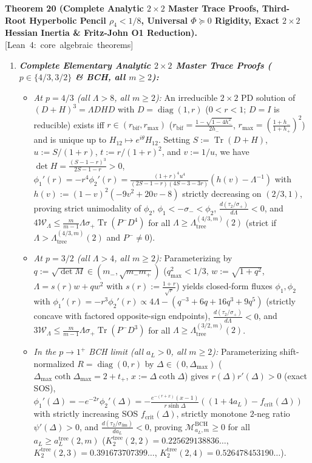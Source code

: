 \documentclass[10pt,letterpaper]{article}
\newcommand{\leanbadge}[1]{\mbox{\sffamily\scriptsize\color{leanborder}[#1]}}
\newcommand{\Tr}{\operatorname{Tr}}
\newcommand{\diag}{\operatorname{diag}}
\begin{document}
\begin{tcolorbox}[mathbox]
\textbf{Theorem 20 (Complete Analytic $2\times 2$ Master Trace Proofs, Third-Root Hyperbolic Pencil $\rho_4 < 1/8$, Universal $\Phi \succeq 0$ Rigidity, Exact $2\times 2$ Hessian Inertia \& Fritz-John O1 Reduction).}\hfill\leanbadge{Lean~4: core algebraic theorems}\par\vspace{1.5pt}
\begin{enumerate}[label=(\alph*),leftmargin=1.8em,itemsep=2pt,topsep=2pt]
  \item \emph{\textbf{Complete Elementary Analytic $2\times 2$ Master Trace Proofs ($p \in \{4/3, 3/2\}$ \& BCH, all $m \ge 2$):}}
  \begin{itemize}[leftmargin=1.2em,itemsep=1pt,topsep=1pt]
    \item \emph{At $p = 4/3$ (all $\Lambda > 8$, all $m \ge 2$):} An irreducible $2\times 2$ PD solution of $(D+H)^3 = \Lambda DHD$ with $D = \diag(1, r)$ ($0 < r < 1$; $D = I$ is reducible) exists iff $r \in (r_{\mathrm{bif}}, r_{\max})$ ($r_{\mathrm{bif}} = \frac{1-\sqrt{1-4h_-^2}}{2h_-}$, $r_{\max} = (\frac{1+h_-}{1+h_+})^2$) and is unique up to $H_{12} \mapsto e^{i\theta} H_{12}$. Setting $S := \Tr(D+H)$, $u := S/(1+r)$, $t := r/(1+r)^2$, and $v := 1/u$, we have $\det H = \frac{(S-1-r)^3}{2S-1-r} > 0$, $\phi_1'(r) = -r^4\phi_2'(r) = \frac{(1+r)^4 u^4}{(2S-1-r)(4S-3-3r)}(h(v) - \Lambda^{-1})$ with $h(v) := (1-v)^2(-9v^2+20v-8)$ strictly decreasing on $(2/3, 1)$, proving strict unimodality of $\phi_2$, $\phi_1 < -\sigma_- < \phi_2$, $\frac{d(\tau_2/\sigma_+)}{d\Lambda} < 0$, and $4\mathcal{W}_\Lambda \le \frac{m}{m-1}\Lambda\sigma_+\Tr(P^- D^4)$ for all $\Lambda \ge \Lambda_{\mathrm{tree}}^{(4/3,m)}(2)$ (strict if $\Lambda > \Lambda_{\mathrm{tree}}^{(4/3,m)}(2)$ and $P^- \neq 0$).
    \item \emph{At $p = 3/2$ (all $\Lambda > 4$, all $m \ge 2$):} Parameterizing by $q := \sqrt{\det M} \in (m_-, \sqrt{m_- m_+})$ ($q_{\max}^2 < 1/3$, $w := \sqrt{1+q^2}$, $\Lambda = s(r) w + q w^2$ with $s(r) := \frac{1+r}{\sqrt{r}}$) yields closed-form fluxes $\phi_1, \phi_2$ with $\phi_1'(r) = -r^3\phi_2'(r) \propto 4\Lambda - (q^{-3} + 6q + 16q^3 + 9q^5)$ (strictly concave with factored opposite-sign endpoints), $\frac{d(\tau_2/\sigma_+)}{d\Lambda} < 0$, and $3\mathcal{W}_\Lambda \le \frac{m}{m-1}\Lambda\sigma_+\Tr(P^- D^3)$ for all $\Lambda \ge \Lambda_{\mathrm{tree}}^{(3/2,m)}(2)$.
    \item \emph{In the $p \to 1^+$ BCH limit (all $a_L > 0$, all $m \ge 2$):} Parameterizing shift-normalized $R = \diag(0, r)$ by $\Delta \in (0, \Delta_{\max})$ ($\Delta_{\max}\coth\Delta_{\max} = 2 + t_+$, $x := \Delta\coth\Delta$) gives $r(\Delta)r'(\Delta) > 0$ (exact SOS), $\phi_1'(\Delta) = -e^{-2r}\phi_2'(\Delta) = -\frac{e^{-(r+x)}(x-1)}{r\sinh\Delta}((1+4a_L) - f_{\mathrm{crit}}(\Delta))$ with strictly increasing SOS $f_{\mathrm{crit}}(\Delta)$, strictly monotone $2$-neg ratio $\psi'(\Delta) > 0$, and $\frac{d(\tau_2/\sigma_{\lim})}{da_L} < 0$, proving $\mathcal{M}_{a_L,m}^{\mathrm{BCH}} \ge 0$ for all $a_L \ge a_L^{\mathrm{tree}}(2, m)$ ($K_2^{\mathrm{tree}}(2,2) = 0.225629138836\dots$, $K_2^{\mathrm{tree}}(2,3) = 0.391673707399\dots$, $K_2^{\mathrm{tree}}(2,4) = 0.526478453190\dots$).

\end{itemize}
\end{enumerate}
\end{tcolorbox}
\end{document}
